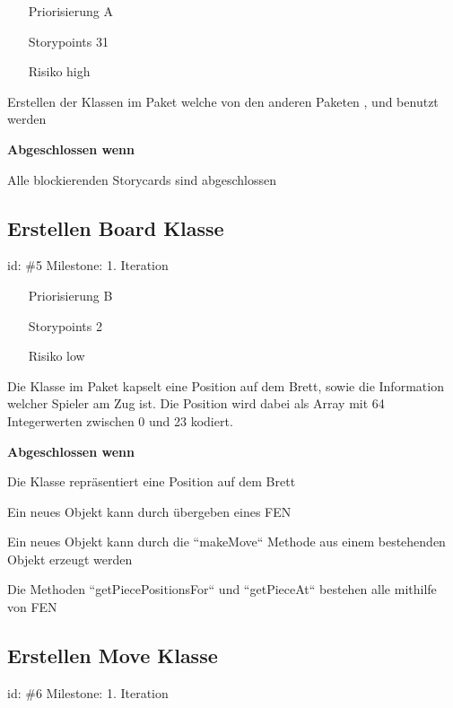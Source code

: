 \begin{itemize}
\item[Priorisierung] A
\item[Storypoints] 31
\item[Risiko] high
\end{itemize}

Erstellen der Klassen im Paket  welche von den anderen Paketen ,  und  benutzt werden

\textbf{Abgeschlossen wenn}
\begin{todolist}
    \item[\done]  Alle blockierenden Storycards sind abgeschlossen

\end{todolist}


\subsection*{Erstellen Board Klasse}
id: \#5 Milestone: 1. Iteration\\

\begin{itemize}
\item[Priorisierung] B
\item[Storypoints] 2
\item[Risiko] low
\end{itemize}

Die  Klasse im Paket  kapselt eine Position auf dem Brett, sowie die Information welcher Spieler am Zug ist. Die Position wird dabei als Array mit 64 Integerwerten zwischen 0 und 23 kodiert.

\textbf{Abgeschlossen wenn}
\begin{todolist}
    \item[\done]  Die Klasse repräsentiert eine Position auf dem Brett
  \item[\done]  Ein neues Objekt kann durch übergeben eines FEN
  \item[\done]  Ein neues Objekt kann durch die ``makeMove`` Methode aus einem bestehenden Objekt erzeugt werden
  \item[\done]  Die Methoden ``getPiecePositionsFor`` und ``getPieceAt`` bestehen alle mithilfe von FEN

\end{todolist}


\subsection*{Erstellen Move Klasse}
id: \#6 Milestone: 1. Iteration\\

